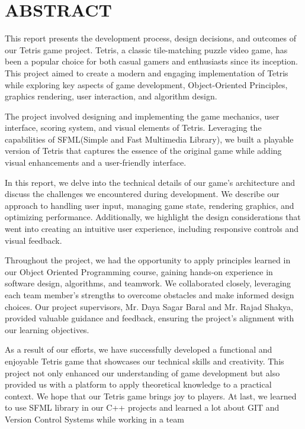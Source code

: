 

\newpage
\section{ABSTRACT}

This report presents the development process, design decisions, and outcomes of our Tetris game project. Tetris, a classic tile-matching puzzle video game, has been a popular choice for both casual gamers and enthusiasts since its inception. This project aimed to create a modern and engaging implementation of Tetris while exploring key aspects of game development, Object-Oriented Principles, graphics rendering, user interaction, and algorithm design.

The project involved designing and implementing the game mechanics, user interface, scoring system, and visual elements of Tetris. Leveraging the capabilities of SFML(Simple and Fast Multimedia Library), we built a playable version of Tetris that captures the essence of the original game while adding visual enhancements and a user-friendly interface. 

In this report, we delve into the technical details of our game's architecture and discuss the challenges we encountered during development. We describe our approach to handling user input, managing game state, rendering graphics, and optimizing performance. Additionally, we highlight the design considerations that went into creating an intuitive user experience, including responsive controls and visual feedback.

Throughout the project, we had the opportunity to apply principles learned in our Object Oriented Programming course, gaining hands-on experience in software design, algorithms, and teamwork. We collaborated closely, leveraging each team member's strengths to overcome obstacles and make informed design choices. Our project supervisors, Mr. Daya Sagar Baral and Mr. Rajad Shakya, provided valuable guidance and feedback, ensuring the project's alignment with our learning objectives.

As a result of our efforts, we have successfully developed a functional and enjoyable Tetris game that showcases our technical skills and creativity. This project not only enhanced our understanding of game development but also provided us with a platform to apply theoretical knowledge to a practical context. We hope that our Tetris game brings joy to players.
At last, we learned to use SFML library in our C++ projects and learned a lot about GIT and Version Control Systems while working in a team\\
